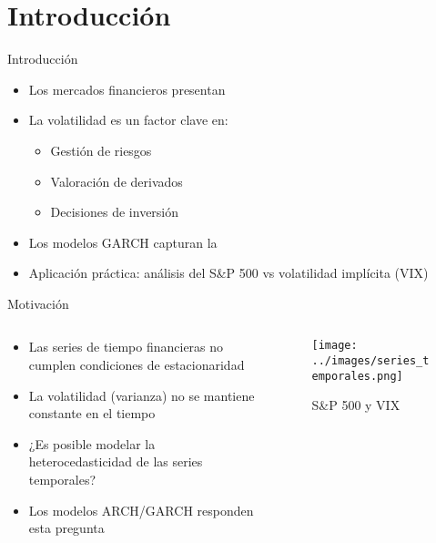 \section{Introducción}

\begin{frame}{Introducción}
    \begin{itemize}
        \item<1-> Los mercados financieros presentan 
        \item<2-> La volatilidad es un factor clave en:
        \begin{itemize}
            \item Gestión de riesgos
            \item Valoración de derivados
            \item Decisiones de inversión
        \end{itemize}
        \item<3-> Los modelos GARCH capturan la 
        \item<4-> Aplicación práctica: análisis del S\&P 500 vs volatilidad implícita (VIX)
    \end{itemize}
\end{frame}

\begin{frame}{Motivación}
    \begin{columns}
        \begin{column}{0.6\textwidth}
            \begin{itemize}
                \item<1-> Las series de tiempo financieras no cumplen condiciones de estacionaridad
                \item<2-> La volatilidad (varianza) no se mantiene constante en el tiempo
                \item<3-> ¿Es posible modelar la heterocedasticidad de las series temporales?
                \item<4-> Los modelos ARCH/GARCH responden esta pregunta
            \end{itemize}
        \end{column}
        \begin{column}{0.4\textwidth}
            \begin{figure}
                \centering
                \texttt{[image: ../images/series\_temporales.png]}
                \caption{\footnotesize S\&P 500 y VIX}
            \end{figure}
        \end{column}
    \end{columns}
\end{frame}

